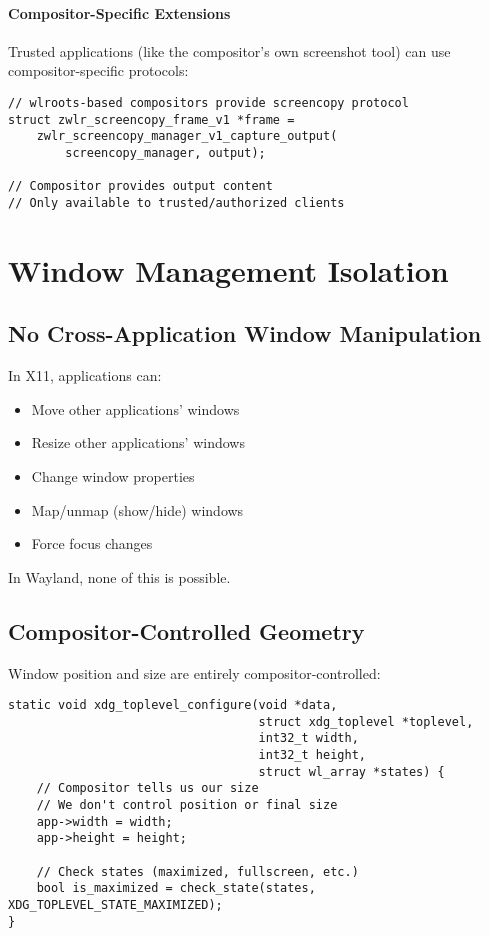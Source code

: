 \paragraph{Compositor-Specific Extensions}

Trusted applications (like the compositor's own screenshot tool) can use compositor-specific protocols:

\begin{lstlisting}[style=cstyle, caption=wlr-screencopy Protocol]
// wlroots-based compositors provide screencopy protocol
struct zwlr_screencopy_frame_v1 *frame =
    zwlr_screencopy_manager_v1_capture_output(
        screencopy_manager, output);

// Compositor provides output content
// Only available to trusted/authorized clients
\end{lstlisting}

\section{Window Management Isolation}

\subsection{No Cross-Application Window Manipulation}

In X11, applications can:
\begin{itemize}
    \item Move other applications' windows
    \item Resize other applications' windows
    \item Change window properties
    \item Map/unmap (show/hide) windows
    \item Force focus changes
\end{itemize}

In Wayland, none of this is possible.

\subsection{Compositor-Controlled Geometry}

Window position and size are entirely compositor-controlled:

\begin{lstlisting}[style=cstyle, caption=Window Configuration]
static void xdg_toplevel_configure(void *data,
                                   struct xdg_toplevel *toplevel,
                                   int32_t width,
                                   int32_t height,
                                   struct wl_array *states) {
    // Compositor tells us our size
    // We don't control position or final size
    app->width = width;
    app->height = height;

    // Check states (maximized, fullscreen, etc.)
    bool is_maximized = check_state(states, XDG_TOPLEVEL_STATE_MAXIMIZED);
}
\end{lstlisting}

